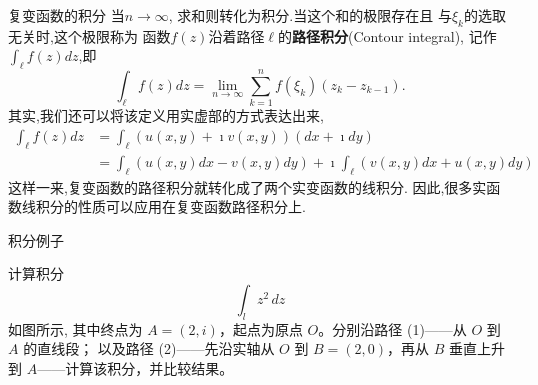 \documentclass[fontset=windows, chinese, 10pt]{beamer}
\begin{document}
\begin{frame}{复变函数的积分}
当$n\to \infty$, 求和则转化为积分.当这个和的极限存在且
与$\xi_k$的选取无关时,这个极限称为
函数$f(z)$沿着路径$\ell$的\textbf{路径积分}(Contour integral), 记作
$\int_{\ell} f(z) dz$,即
\begin{equation}
    \int_{\ell} f(z) dz = \lim_{n\to \infty} \sum_{k=1}^{n} f(\xi_k) (z_{k} - z_{k-1}) . 
\end{equation}
其实,我们还可以将该定义用实虚部的方式表达出来,
\begin{align}
    \int_{\ell} f(z) dz  & = \int_{\ell} \left( u(x,y) + \imath v(x,y) \right) (dx + \imath dy) 
    \\
    & = \int_{\ell} \left( u(x,y) dx  -  v(x,y) dy \right) + \imath \int_{\ell}  \left( v(x,y) dx  + u(x,y)dy \right) 
\end{align}
这样一来,复变函数的路径积分就转化成了两个实变函数的线积分.
因此,很多实函数线积分的性质可以应用在复变函数路径积分上.

\end{frame}

\begin{frame}{积分例子}
\small
\begin{example}
计算积分
\[
\int_{l} z^{2}\,dz
\]
如图所示, 其中终点为 \(A=(2,i)\)，起点为原点 \(O\)。分别沿路径 (1)——从 \(O\) 到 \(A\) 的直线段；
以及路径 (2)——先沿实轴从 \(O\) 到 \(B=(2,0)\)，再从 \(B\) 垂直上升到 \(A\)——计算该积分，并比较结果。

\begin{center}
\end{center}


\end{example}






\end{frame}
\end{document}
